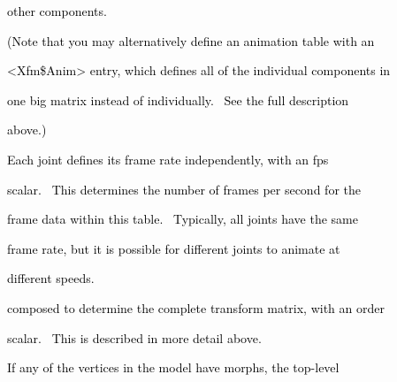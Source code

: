 \documentclass[a4paper]{article}
\newcommand\textstyleOOoComputerKeyWord[1]{\textrm{\textcolor[rgb]{0.0,0.0,0.5019608}{#1}}}
\begin{document}
{\color{black}
\textstyleOOoComputerKeyWord{\textcolor{black}{\ \ other components.}}}


\bigskip

{\color{black}
\textstyleOOoComputerKeyWord{\textcolor{black}{\ \ (Note that you may alternatively define an animation table with an}}}

{\color{black}
\textstyleOOoComputerKeyWord{\textcolor{black}{\ \ {\textless}Xfm\$Anim{\textgreater} entry, which defines all of the
individual components in}}}

{\color{black}
\textstyleOOoComputerKeyWord{\textcolor{black}{\ \ one big matrix instead of individually. \ See the full description}}}

{\color{black}
\textstyleOOoComputerKeyWord{\textcolor{black}{\ \ above.)}}}


\bigskip

{\color{black}
\textstyleOOoComputerKeyWord{\textcolor{black}{\ \ Each joint defines its frame rate independently, with an
{\textquotedbl}fps{\textquotedbl}}}}

{\color{black}
\textstyleOOoComputerKeyWord{\textcolor{black}{\ \ scalar. \ This determines the number of frames per second for the}}}

{\color{black}
\textstyleOOoComputerKeyWord{\textcolor{black}{\ \ frame data within this table. \ Typically, all joints have the
same}}}

{\color{black}
\textstyleOOoComputerKeyWord{\textcolor{black}{\ \ frame rate, but it is possible for different joints to animate at}}}

{\color{black}
\textstyleOOoComputerKeyWord{\textcolor{black}{\ \ different speeds.}}}


\bigskip

\clearpage{\color{black}
\textstyleOOoComputerKeyWord{\textcolor{black}{\ \ Each joint also defines the order in which its components should
be}}}

{\color{black}
\textstyleOOoComputerKeyWord{\textcolor{black}{\ \ composed to determine the complete transform matrix, with an
{\textquotedbl}order{\textquotedbl}}}}

{\color{black}
\textstyleOOoComputerKeyWord{\textcolor{black}{\ \ scalar. \ This is described in more detail above.}}}


\bigskip


\bigskip

{\color{black}
\textstyleOOoComputerKeyWord{\textcolor{black}{\ \ If any of the vertices in the model have morphs, the top-level}}}
\end{document}
